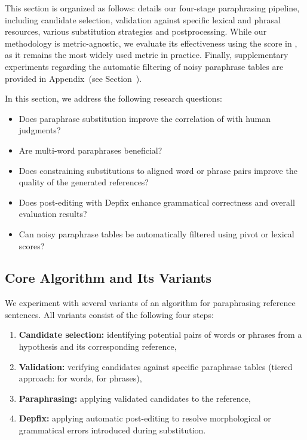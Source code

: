  This section is organized as follows:  details our four-stage paraphrasing pipeline, including candidate selection, validation against specific lexical and phrasal resources, various substitution strategies and postprocessing. While our methodology is metric-agnostic, we evaluate its effectiveness using the \bleu score in , as it remains the most widely used metric in practice. Finally, supplementary experiments regarding the automatic filtering of noisy paraphrase tables are provided in Appendix~(see Section~).

\pagebreak

\begin{mdframed}[
    linecolor=gray,
    linewidth=2pt,
    roundcorner=5,
    backgroundcolor=gray!5
]
\noindent
In this section, we address the following research questions:

\begin{itemize}
    \item Does paraphrase substitution improve the correlation of \bleu with human judgments?
    \item Are multi-word paraphrases beneficial?
    \item Does constraining substitutions to aligned word or phrase pairs improve the quality of the generated references?
    \item Does post-editing with Depfix enhance grammatical correctness and overall evaluation results?
    \item Can noisy paraphrase tables be automatically filtered using pivot or lexical scores?
\end{itemize}

\end{mdframed}

\subsection{Core Algorithm and Its Variants}
\label{algorithm}
We experiment with several variants of an algorithm for paraphrasing reference sentences. All variants consist of the following four steps:
\begin{enumerate}
\item[(1)] \textbf{Candidate selection:} identifying potential pairs of words or phrases from a hypothesis and its corresponding reference, %
\item[(2)] \textbf{Validation:} verifying candidates against specific paraphrase tables (tiered approach: \fm for words, \cmpt for phrases), %
\item[(3)] \textbf{Paraphrasing:} applying validated candidates to the reference, %
\item[(4)] \textbf{Depfix:} applying automatic post-editing to resolve morphological or grammatical errors introduced during substitution. %
\end{enumerate}

